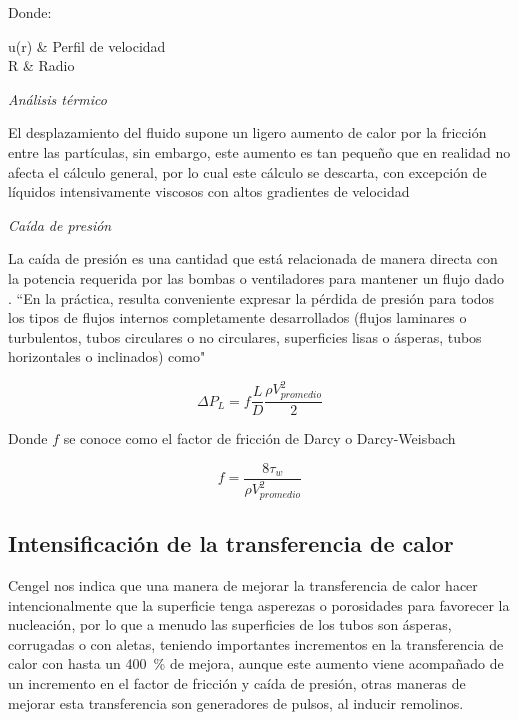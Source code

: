 				Donde:
				\begin{conditions}
					u(r) & Perfil de velocidad \\
					R & Radio
				\end{conditions}
				
				
				{\textit{Análisis térmico}}

				El desplazamiento del fluido supone un ligero aumento de calor por la fricción entre las partículas, sin embargo, este aumento es tan pequeño que en realidad no afecta el cálculo general, por lo cual este cálculo se descarta, con excepción de líquidos intensivamente viscosos con altos gradientes de velocidad

				{\textit{Caída de presión}}

				La caída de presión es una cantidad que está relacionada de manera directa con la potencia requerida por las bombas o ventiladores para mantener un flujo dado \cite{cengel_transferencia_2010}. ``En la práctica, resulta conveniente expresar la pérdida de presión para todos los tipos de flujos internos completamente desarrollados (flujos laminares o turbulentos, tubos circulares o no circulares, superficies lisas o ásperas, tubos horizontales o inclinados) como"

				\begin{equation}
					\label{equ:caida-presion}
					\Delta P_{L} = f\dfrac{L}{D}\dfrac{\rho V_{promedio}^{2}}{2}
				\end{equation}

				Donde $f$ se conoce como el factor de fricción de Darcy o Darcy-Weisbach

				\begin{equation}
					\label{equ:ff-darcy}
					f = \dfrac{8\tau_{w}}{\rho V_{promedio}^{2}}
				\end{equation}

			\subsection{Intensificación de la transferencia de calor}

				Cengel \cite{cengel_transferencia_2010} nos indica que una manera de mejorar la transferencia de calor hacer intencionalmente que la superficie tenga asperezas o porosidades para favorecer la nucleación, por lo que a menudo las superficies de los tubos son ásperas, corrugadas o con aletas, teniendo importantes incrementos en la transferencia de calor con hasta un \qty{400}{\percent} de mejora, aunque este aumento viene acompañado de un incremento en el factor de fricción y caída de presión, otras maneras de mejorar esta transferencia son generadores de pulsos, al inducir remolinos.

